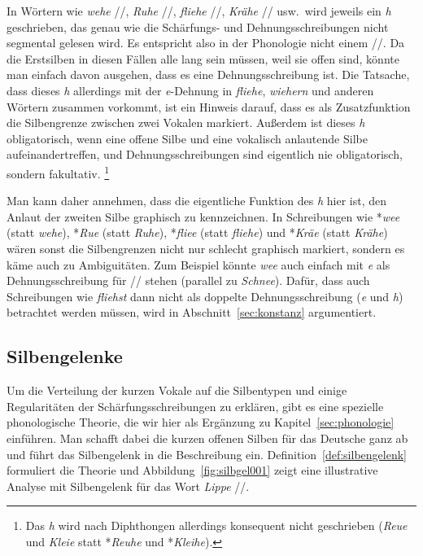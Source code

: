 In Wörtern wie \textit{wehe} //, \textit{Ruhe} //, \textit{fliehe} //, \textit{Krähe} // usw.\ wird jeweils ein \textit{h} geschrieben, das genau wie die Schärfungs- und Dehnungsschreibungen nicht segmental gelesen wird.
Es entspricht also in der Phonologie nicht einem //.
Da die Erstsilben in diesen Fällen alle lang sein müssen, weil sie offen sind, könnte man einfach davon ausgehen, dass es eine Dehnungsschreibung ist.
Die Tatsache, dass dieses \textit{h} allerdings mit der \textit{e}-Dehnung in \textit{fliehe}, \textit{wiehern} und anderen Wörtern zusammen vorkommt, ist ein Hinweis darauf, dass es als Zusatzfunktion die Silbengrenze zwischen zwei Vokalen markiert.
Außerdem ist dieses \textit{h} obligatorisch, wenn eine offene Silbe und eine vokalisch anlautende Silbe aufeinandertreffen, und Dehnungsschreibungen sind eigentlich nie obligatorisch, sondern fakultativ.%
\footnote{Das \textit{h} wird nach Diphthongen allerdings konsequent nicht geschrieben (\zB \textit{Reue} und \textit{Kleie} statt *\textit{Reuhe} und *\textit{Kleihe}).}

Man kann daher annehmen, dass die eigentliche Funktion des \textit{h} hier ist, den Anlaut der zweiten Silbe graphisch zu kennzeichnen.
In Schreibungen wie *\textit{wee} (statt \textit{wehe}), *\textit{Rue} (statt \textit{Ruhe}), *\textit{fliee} (statt \textit{fliehe}) und *\textit{Kräe} (statt \textit{Krähe}) wären sonst die Silbengrenzen nicht nur schlecht graphisch markiert, sondern es käme auch zu Ambiguitäten.
Zum Beispiel könnte \textit{wee} auch einfach mit \textit{e} als Dehnungsschreibung für // stehen (parallel zu \textit{Schnee}).
Dafür, dass auch Schreibungen wie \textit{fliehst} dann nicht als doppelte Dehnungsschreibung (\textit{e} und \textit{h}) betrachtet werden müssen, wird in Abschnitt~\ref{sec:konstanz} argumentiert.

\subsection{Silbengelenke}

\label{sec:silbengelenk}

Um die Verteilung der kurzen Vokale auf die Silbentypen und einige Regularitäten der Schärfungsschreibungen zu erklären, gibt es eine spezielle phonologische Theorie, die wir hier als Ergänzung zu Kapitel~\ref{sec:phonologie} einführen.
Man schafft dabei die kurzen offenen Silben für das Deutsche ganz ab und führt das Silbengelenk in die Beschreibung ein.
Definition~\ref{def:silbengelenk} formuliert die Theorie und Abbildung~\ref{fig:silbgel001} zeigt eine illustrative Analyse mit Silbengelenk für das Wort \textit{Lippe} //.

